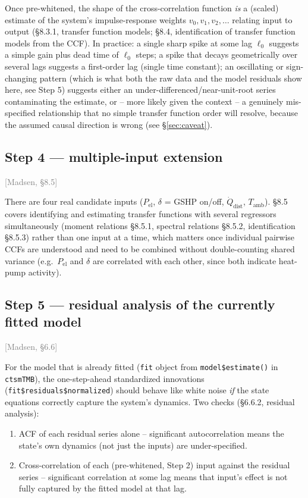 \documentclass[11pt]{article}
\newcommand{\madsen}[1]{\textcolor{gray}{[Madsen, \S#1]}}
\begin{document}
Once pre-whitened, the shape of the cross-correlation function \emph{is} a
(scaled) estimate of the system's impulse-response weights $v_0, v_1, v_2,
\dots$ relating input to output (\S8.3.1, transfer function models;
\S8.4, identification of transfer function models from the CCF). In
practice: a single sharp spike at some lag $\ell_0$ suggests a simple gain
plus dead time of $\ell_0$ steps; a spike that decays geometrically over
several lags suggests a first-order lag (single time constant); an
oscillating or sign-changing pattern (which is what both the raw data and
the model residuals show here, see Step 5) suggests either an
under-differenced/near-unit-root series contaminating the estimate, or --
more likely given the context -- a genuinely mis-specified relationship
that no simple transfer function order will resolve, because the assumed
causal direction is wrong (see \S\ref{sec:caveat}).

\subsection*{Step 4 --- multiple-input extension} \madsen{8.5}

There are four real candidate inputs ($P_{\text{el}}$, $\delta$ = GSHP
on/off, $\dot Q_{\text{dist}}$, $T_{\text{amb}}$). \S8.5 covers identifying
and estimating transfer functions with several regressors simultaneously
(moment relations \S8.5.1, spectral relations \S8.5.2, identification
\S8.5.3) rather than one input at a time, which matters once individual
pairwise CCFs are understood and need to be combined without
double-counting shared variance (e.g.\ $P_{\text{el}}$ and $\delta$ are
correlated with each other, since both indicate heat-pump activity).

\subsection*{Step 5 --- residual analysis of the currently fitted model} \madsen{6.6}

For the model that is already fitted (\texttt{fit} object from
\texttt{model\$estimate()} in \texttt{ctsmTMB}), the one-step-ahead
standardized innovations (\texttt{fit\$residuals\$normalized}) should behave
like white noise \emph{if} the state equations correctly capture the
system's dynamics. Two checks (\S6.6.2, residual analysis):
\begin{enumerate}[label=(\alph*)]
\item ACF of each residual series alone -- significant autocorrelation means
  the state's own dynamics (not just the inputs) are under-specified.
\item Cross-correlation of each (pre-whitened, Step 2) input against the
  residual series -- significant correlation at some lag means that input's
  effect is not fully captured by the fitted model at that lag.
\end{enumerate}
\end{document}
